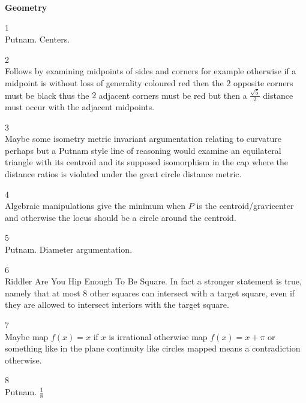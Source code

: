 \newpage

\textbf{Geometry}

1 \\
Putnam. Centers.

2 \\
Follows by examining midpoints of sides and corners for example otherwise if a midpoint is without loss of generality coloured red then the $2$ opposite corners must be black thus the $2$ adjacent corners must be red but then a $\frac{\sqrt{5}}{2}$ distance must occur with the adjacent midpoints.

3 \\
Maybe some isometry metric invariant argumentation relating to curvature perhaps but a Putnam style line of reasoning would examine an equilateral triangle with its centroid and its supposed isomorphism in the cap where the distance ratios is violated under the great circle distance metric.

4 \\
Algebraic manipulations give the minimum when $P$ is the centroid/gravicenter and otherwise the locus should be a circle around the centroid.

5 \\
Putnam. Diameter argumentation.

6 \\
Riddler Are You Hip Enough To Be Square. In fact a stronger statement is true, namely that at most $8$ other squares can intersect with a target square, even if they are allowed to intersect interiors with the target square.

7 \\
Maybe map $f(x)=x$ if $x$ is irrational otherwise map $f(x)=x+\pi$ or something like in the plane continuity like circles mapped means a contradiction otherwise.

8 \\
Putnam. $\boxed{\frac{1}{8}}$